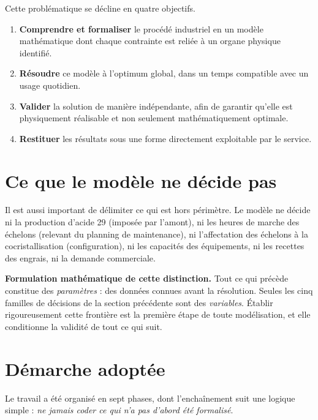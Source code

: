 Cette problématique se décline en quatre objectifs.

\begin{enumerate}
  \item \textbf{Comprendre et formaliser} le procédé industriel en un modèle mathématique
        dont chaque contrainte est reliée à un organe physique identifié.
  \item \textbf{Résoudre} ce modèle à l'optimum global, dans un temps compatible avec un
        usage quotidien.
  \item \textbf{Valider} la solution de manière indépendante, afin de garantir qu'elle est
        physiquement réalisable et non seulement mathématiquement optimale.
  \item \textbf{Restituer} les résultats sous une forme directement exploitable par le
        service.
\end{enumerate}

\section{Ce que le modèle ne décide pas}

Il est aussi important de délimiter ce qui est hors périmètre. Le modèle ne décide ni la
production d'acide 29 (imposée par l'amont), ni les heures de marche des échelons (relevant
du planning de maintenance), ni l'affectation des échelons à la cocristallisation
(configuration), ni les capacités des équipements, ni les recettes des engrais, ni la
demande commerciale.

\begin{encadre}
\textbf{Formulation mathématique de cette distinction.} Tout ce qui précède constitue des
\emph{paramètres} : des données connues avant la résolution. Seules les cinq familles de
décisions de la section précédente sont des \emph{variables}. Établir rigoureusement cette
frontière est la première étape de toute modélisation, et elle conditionne la validité de
tout ce qui suit.
\end{encadre}

\section{Démarche adoptée}

Le travail a été organisé en sept phases, dont l'enchaînement suit une logique simple :
\emph{ne jamais coder ce qui n'a pas d'abord été formalisé}.

